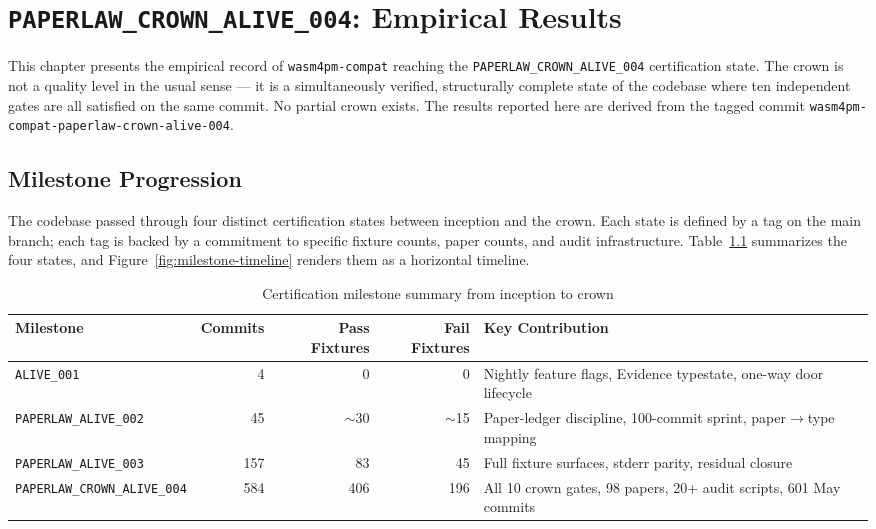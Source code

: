 \chapter{\texttt{PAPERLAW\_CROWN\_ALIVE\_004}: Empirical Results}
\label{ch:crown}

This chapter presents the empirical record of \texttt{wasm4pm-compat} reaching
the \texttt{PAPERLAW\_CROWN\_ALIVE\_004} certification state. The crown is not a
quality level in the usual sense --- it is a simultaneously verified, structurally
complete state of the codebase where ten independent gates are all satisfied on
the same commit. No partial crown exists. The results reported here are derived
from the tagged commit \texttt{wasm4pm-compat-paperlaw-crown-alive-004}.

\section{Milestone Progression}
\label{sec:crown-milestones}

The codebase passed through four distinct certification states between inception
and the crown. Each state is defined by a tag on the main branch; each tag is
backed by a commitment to specific fixture counts, paper counts, and audit
infrastructure. Table~\ref{tab:milestone-summary} summarizes the four states,
and Figure~\ref{fig:milestone-timeline} renders them as a horizontal timeline.

\begin{table}[ht]
\centering
\caption{Certification milestone summary from inception to crown}
\label{tab:milestone-summary}
\begin{tabular}{@{}lrrrp{5.5cm}@{}}
\toprule
Milestone & Commits & Pass Fixtures & Fail Fixtures & Key Contribution \\
\midrule
\texttt{ALIVE\_001} & 4 & 0 & 0 & Nightly feature flags, Evidence typestate, one-way door lifecycle \\
\texttt{PAPERLAW\_ALIVE\_002} & 45 & $\sim$30 & $\sim$15 & Paper-ledger discipline, 100-commit sprint, paper$\to$type mapping \\
\texttt{PAPERLAW\_ALIVE\_003} & 157 & 83 & 45 & Full fixture surfaces, stderr parity, residual closure \\
\texttt{PAPERLAW\_CROWN\_ALIVE\_004} & 584 & 406 & 196 & All 10 crown gates, 98 papers, 20+ audit scripts, 601 May commits \\
\bottomrule
\end{tabular}
\end{table}

